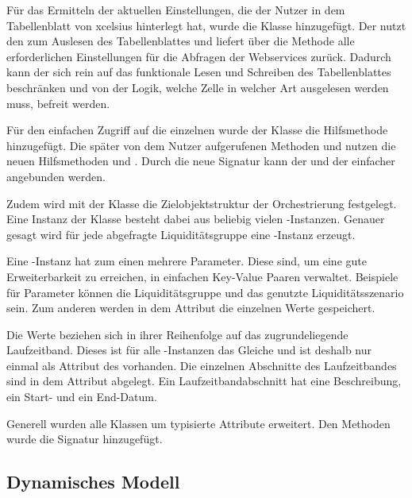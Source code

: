 \begin{onehalfspacing}
Für das Ermitteln der aktuellen Einstellungen, die der Nutzer in dem Tabellenblatt von \gls{xcelsius} hinterlegt hat, wurde die Klasse  hinzugefügt. Der  nutzt den  zum Auslesen des Tabellenblattes und liefert über die Methode  alle erforderlichen Einstellungen für die Abfragen der Webservices zurück. Dadurch kann der  sich rein auf das funktionale Lesen und Schreiben des Tabellenblattes beschränken und von der Logik, welche Zelle in welcher Art ausgelesen werden muss, befreit werden.

Für den einfachen Zugriff auf die einzelnen  wurde der Klasse  die Hilfsmethode  hinzugefügt. Die später von dem Nutzer aufgerufenen Methoden  und  nutzen die neuen Hilfsmethoden  und . Durch die neue Signatur kann der  und der  einfacher angebunden werden.

\label{sec:entwurf:statisch:orchestratorresult}
Zudem wird mit der Klasse  die Zielobjektstruktur der Orchestrierung festgelegt. Eine Instanz der Klasse  besteht dabei aus beliebig vielen -Instanzen. Genauer gesagt wird für jede abgefragte Liquiditätsgruppe eine -Instanz erzeugt.

Eine -Instanz hat zum einen mehrere Parameter. Diese sind, um eine gute Erweiterbarkeit zu erreichen, in einfachen Key-Value Paaren verwaltet. Beispiele für Parameter können die Liquiditätsgruppe und das genutzte Liquiditätsszenario sein. Zum anderen werden in dem Attribut  die einzelnen Werte gespeichert.

Die Werte beziehen sich in ihrer Reihenfolge auf das zugrundeliegende Laufzeitband. Dieses ist für alle -Instanzen das Gleiche und ist deshalb nur einmal als Attribut des  vorhanden. Die einzelnen Abschnitte des Laufzeitbandes sind in dem Attribut  abgelegt. Ein Laufzeitbandabschnitt hat eine Beschreibung, ein Start- und ein End-Datum.

Generell wurden alle Klassen um typisierte Attribute erweitert. Den Methoden wurde die Signatur hinzugefügt.

\subsection{Dynamisches Modell}


\end{onehalfspacing}
